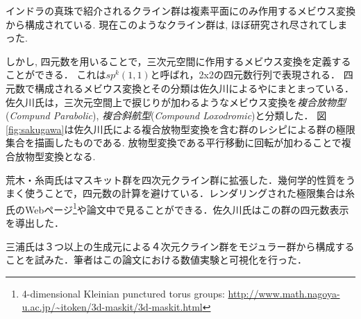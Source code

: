 インドラの真珠で紹介されるクライン群は複素平面にのみ作用するメビウス変換から構成されている.
現在このようなクライン群は, ほぼ研究され尽されてしまった.

しかし, 四元数を用いることで，三次元空間に作用するメビウス変換を定義することができる．
これは$sp^k(1, 1)$と呼ばれ，2x2の四元数行列で表現される．
四元数で構成されるメビウス変換とその分類は佐久川による\cite{sakugawaMaster}や\cite{accidentalParabolic}にまとまっている．佐久川氏は，三次元空間上で捩じりが加わるようなメビウス変換を\emph{複合放物型}({\it Compund Parabolic}), \emph{複合斜航型}({\it Compound Loxodromic})と分類した．
図\ref{fig:sakugawa}は佐久川氏による複合放物型変換を含む群のレシピによる群の極限集合を描画したものである.
放物型変換である平行移動に回転が加わることで複合放物型変換となる.

荒木・糸両氏はマスキット群を四次元クライン群に拡張した\cite{maskit}．幾何学的性質をうまく使うことで，四元数の計算を避けている．レンダリングされた極限集合は糸氏のWebページ\footnote{4-dimensional Kleinian punctured torus groups: \url{http://www.math.nagoya-u.ac.jp/~itoken/3d-maskit/3d-maskit.html}}や論文中で見ることができる．佐久川氏はこの群の四元数表示を導出した\cite{sakugawa4d}．

三浦氏は３つ以上の生成元による４次元クライン群をモジュラー群から構成することを試みた\cite{miura}．筆者はこの論文における数値実験と可視化を行った．

